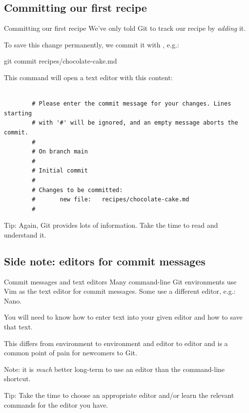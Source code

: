 \subsection{Committing our first recipe}

\begin{frame}[fragile]{Committing our first recipe}
    We've only told Git to track our recipe by \emph{adding} it.

    To save this change permanently, we commit it with ,
    e.g.:

    \begin{shellcode}
        git commit recipes/chocolate-cake.md
    \end{shellcode}

    This command will open a text editor with this content:
    \begin{verbatim}

        # Please enter the commit message for your changes. Lines starting
        # with '#' will be ignored, and an empty message aborts the commit.
        #
        # On branch main
        #
        # Initial commit
        #
        # Changes to be committed:
        #       new file:   recipes/chocolate-cake.md
        #
    \end{verbatim}

     Tip: Again, Git provides lots of information.  Take the
    time to read and understand it.
\end{frame}

\subsection{Side note: editors for commit messages}

\begin{frame}[fragile]{Commit messages and text editors}
    Many command-line Git environments use Vim as the text editor for commit
    messages.  Some use a different editor, e.g.: Nano.

    You will need to know how to enter text into your given editor and how
    to save that text.

    This differs from environment to environment and editor to editor and is
    a common point of pain for newcomers to Git.

    Note: it is \emph{much} better long-term to use an editor than the
     command-line shortcut.

     Tip: Take the time to choose an appropriate
    editor and/or learn the relevant commands for the editor you have.
\end{frame}


